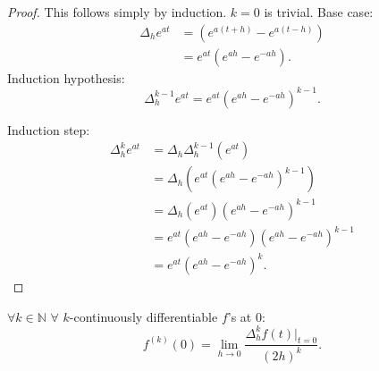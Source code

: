 \documentclass[a4paper,11pt]{article}
\begin{document}
\begin{proof}
    This follows simply by induction. $k=0$ is trivial.
    Base case:
    \begin{align}
        \Delta_{h} e^{at} & =\left( e^{a(t+h)} - e^{a(t-h)} \right) \\
                          & =e^{at}\left( e^{ah} - e^{-ah} \right)
        .
    \end{align}
    Induction hypothesis:
    \begin{equation}
        \Delta^{k-1}_{h} e^{at} = e^{at} \left( e^{ah} - e^{-ah} \right)^{k-1}.
    \end{equation}

    Induction step:
    \begin{align}
        \Delta^{k}_{h} e^{at} & = \Delta_{h} \Delta^{k-1}_{h} (e^{at})                                        \\
                              & = \Delta_{h} \left( e^{at} \left( e^{ah} - e^{-ah} \right)^{k-1} \right)      \\
                              & = \Delta_{h} \left( e^{at}\right) \left( e^{ah} - e^{-ah} \right)^{k-1}       \\
                              & = e^{at}\left( e^{ah} - e^{-ah} \right) \left( e^{ah} - e^{-ah} \right)^{k-1} \\
                              & =  e^{at} \left( e^{ah} - e^{-ah} \right)^{k}.
    \end{align}
\end{proof}


\begin{theorem}
    $\forall k \in \mathbb{N}$ $\forall$  $k$-continuously differentiable $f$'s at $0$:
    \begin{equation}
        f^{(k)}(0) = \lim_{h \to 0} \frac{\Delta^{k}_{h} f(t)|_{t=0}}{(2h)^{k}}.
    \end{equation}
\end{theorem}
\end{document}
